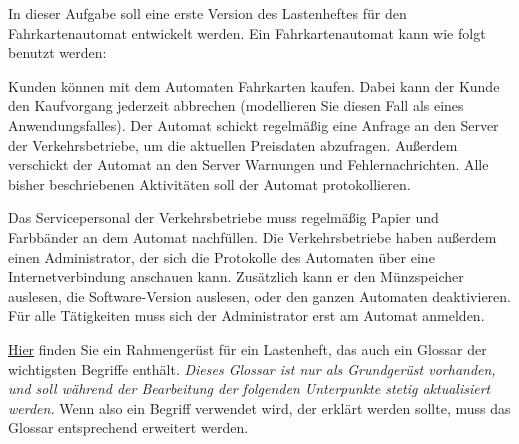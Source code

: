 \documentclass{abgabe}
\begin{document}
\begin{questions}
    In dieser Aufgabe soll eine erste Version des Lastenheftes für den Fahrkartenautomat entwickelt werden. Ein Fahrkartenautomat kann wie folgt benutzt werden:

    Kunden können mit dem Automaten Fahrkarten kaufen.
    Dabei kann der Kunde den Kaufvorgang jederzeit abbrechen (modellieren Sie diesen Fall als  eines Anwendungsfalles).
    Der Automat schickt regelmäßig eine Anfrage an den Server der Verkehrsbetriebe, um die aktuellen Preisdaten abzufragen.
    Außerdem verschickt der Automat an den Server Warnungen und Fehlernachrichten.
    Alle bisher beschriebenen Aktivitäten soll der Automat protokollieren.

    Das Servicepersonal der Verkehrsbetriebe muss regelmäßig Papier und Farbbänder an dem Automat nachfüllen.
    Die Verkehrsbetriebe haben außerdem einen Administrator, der sich die Protokolle des Automaten über eine Internetverbindung anschauen kann.
    Zusätzlich kann er den Münzspeicher auslesen, die Software-Version auslesen, oder den ganzen Automaten deaktivieren.
    Für alle Tätigkeiten muss sich der Administrator erst am Automat anmelden.

    \href{https://www.ili.fh-aachen.de/goto_elearning_file_403173_download.html}{Hier} finden Sie ein Rahmengerüst für ein Lastenheft, das auch ein Glossar der wichtigsten Begriffe enthält.
    \emph{Dieses Glossar ist nur als Grundgerüst vorhanden, und soll während der Bearbeitung der folgenden Unterpunkte stetig aktualisiert werden.}
    Wenn also ein Begriff verwendet wird, der erklärt werden sollte, muss das Glossar entsprechend erweitert werden.


\end{questions}
\end{document}
